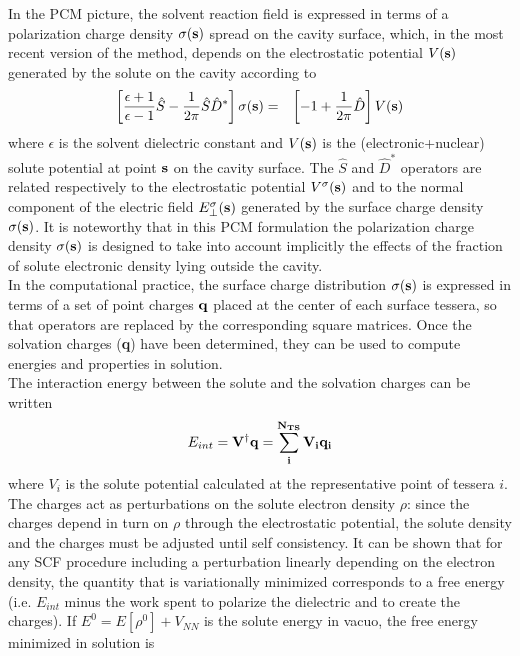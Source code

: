 In the PCM picture, the solvent reaction field is
expressed in terms of a polarization charge density $\sigma(\bf s)$ spread
on the cavity surface, which, in the most recent version of the method,
depends on the electrostatic potential
 $V(\bf s)$ generated by the solute on the cavity according to
\begin{eqnarray}
\left[ \frac{\epsilon+1}{\epsilon-1} \hat S
-\frac{1}{2\pi}\hat S \hat D^* \right]
\sigma(\bf s) &=&
\left[ - 1 + \frac{1}{2\pi} \hat D \right] V(\bf s)
\label{PCM}
\end{eqnarray}
where $\epsilon$ is the solvent dielectric constant and
$V(\bf s)$ is the (electronic+nuclear) solute potential at point
$\bf s$ on the cavity surface.
The $\hat S$ and $\hat D^*$ operators are related respectively to
the electrostatic potential $V^{\sigma}({\bf s})$
and to the normal component of the
electric field $E_\perp^{\sigma}(\bf s)$
generated by the surface charge density $\sigma(\bf s)$.
It is noteworthy that in this PCM formulation the polarization charge
density $\sigma(\bf s)$ is designed to take into account implicitly
the effects of the fraction of solute electronic density lying outside the
cavity.\\
In the computational practice, the surface charge distribution
$\sigma(\bf s)$ is expressed in terms of a set of point charges $\bf q$ placed
at the center of each surface tessera, so that operators are replaced by the
corresponding square matrices.
Once the solvation charges ({\bf q}) have been determined,
they can be used to compute energies and properties in solution.\\
The interaction energy between the solute and the solvation charges
can be written
\begin{equation}
E_{int} = \bf V^\dag \bf q = \sum_i^{N_{TS}} V_i q_i
\end{equation}
where $V_i$ is the solute potential calculated at the representative point
of tessera $i$. The charges act as
perturbations on the solute electron density $\rho$: since the charges
depend in turn on $\rho$ through the electrostatic potential, the solute
density and the charges must be adjusted until self consistency.
It can be shown\cite{Tomasi:94} that for any SCF procedure including a
perturbation linearly depending on the electron density,
the quantity that is variationally minimized corresponds to a free energy
(i.e. $E_{int}$ minus the work spent to polarize the dielectric and to create
the charges).
If $E^0=E[\rho^0] + V_{NN}$ is the solute energy in vacuo, the free energy
minimized in solution is

